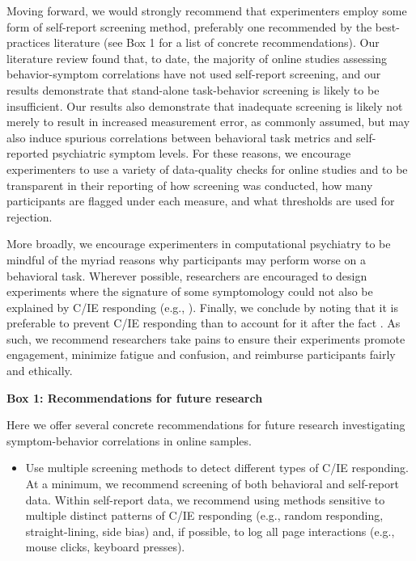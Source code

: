 \documentclass[a4paper,notitlepage,12pt]{article}
\begin{document}
\begin{refsection}[main]

Moving forward, we would strongly recommend that experimenters employ some form of self-report screening method, preferably one recommended by the best-practices literature (see Box 1 for a list of concrete recommendations). Our literature review found that, to date, the majority of online studies assessing behavior-symptom correlations have not used self-report screening, and our results demonstrate that stand-alone task-behavior screening is likely to be insufficient. Our results also demonstrate that inadequate screening is likely not merely to result in increased measurement error, as commonly assumed, but may also induce spurious correlations between behavioral task metrics and self-reported psychiatric symptom levels. For these reasons, we encourage experimenters to use a variety of data-quality checks for online studies and to be transparent in their reporting of how screening was conducted, how many participants are flagged under each measure, and what thresholds are used for rejection.

More broadly, we encourage experimenters in computational psychiatry to be mindful of the myriad reasons why participants may perform worse on a behavioral task. Wherever possible, researchers are encouraged to design experiments where the signature of some symptomology could not also be explained by C/IE responding (e.g., \cite{eldar2015interaction, hunter2019excessive}). Finally, we conclude by noting that it is preferable to prevent C/IE responding than to account for it after the fact \cite{ward2018applying}. As such, we recommend researchers take pains to ensure their experiments promote engagement, minimize fatigue and confusion, and reimburse participants fairly and ethically.

\newpage
\textbf{Box 1: Recommendations for future research}

Here we offer several concrete recommendations for future research investigating symptom-behavior correlations in online samples.

\begin{itemize}

    \item Use multiple screening methods to detect different types of C/IE responding. At a minimum, we recommend screening of both behavioral and self-report data. Within self-report data, we recommend using methods sensitive to multiple distinct patterns of C/IE responding (e.g., random responding, straight-lining, side bias) and, if possible, to log all page interactions (e.g., mouse clicks, keyboard presses).


\end{itemize}
\end{refsection}
\end{document}
